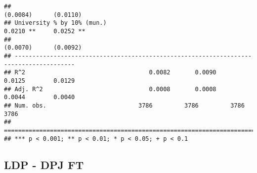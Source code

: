 \documentclass[
]{article}
\begin{document}
\begin{verbatim}
##                                                                (0.0084)      (0.0110)  
## University % by 10% (mun.)                                      0.0210 **     0.0252 **
##                                                                (0.0070)      (0.0092)  
## ---------------------------------------------------------------------------------------
## R^2                                   0.0082       0.0090       0.0125        0.0129   
## Adj. R^2                              0.0008       0.0008       0.0044        0.0040   
## Num. obs.                          3786         3786         3786          3786        
## =======================================================================================
## *** p < 0.001; ** p < 0.01; * p < 0.05; + p < 0.1
\end{verbatim}

\hypertarget{ldp---dpj-ft-4}{%
\subsection{LDP - DPJ FT}\label{ldp---dpj-ft-4}}
\end{document}
